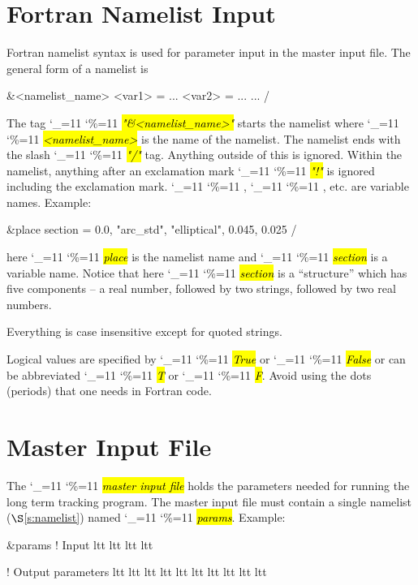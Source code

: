 \documentclass{hitec}
\newcommand\dottcmd[1]{\hl{\em#1}\endgroup}
\newcommand{\vn}{\begingroup\catcode`\_=11 \catcode`\%=11 \dottcmd}
\newcommand{\sref}[1]{$\S$\ref{#1}}
\newcommand{\Section}[1]{\section{#1}\vspace*{-1ex}}
\begin{document}
{{{{{{{{{{{{{{{{{{%
\Section{Fortran Namelist Input}
\label{s:namelist}

Fortran namelist syntax is used for parameter input in the master input file. The general form of a namelist is
\begin{code}
&<namelist_name>
  <var1> = ...
  <var2> = ...
  ...
/
\end{code}
The tag \vn{"\&<namelist_name>"} starts the namelist where
\vn{<namelist_name>} is the name of the namelist. The namelist ends
with the slash \vn{"/"} tag. Anything outside of this is
ignored. Within the namelist, anything after an exclamation mark
\vn{"!"} is ignored including the exclamation mark. \vn{<var1>},
\vn{<var2>}, etc. are variable names. Example:
\begin{code}
&place 
  section = 0.0, "arc_std", "elliptical", 0.045, 0.025 
/
\end{code}
here \vn{place} is the namelist name and \vn{section} is a
variable name.  Notice that here \vn{section} is a ``structure'' which
has five components -- a real number, followed by two strings,
followed by two real numbers.

Everything is case insensitive except for quoted strings.

Logical values are specified by \vn{True} or \vn{False} or can be
abbreviated \vn{T} or \vn{F}. Avoid using the dots (periods) that one
needs in Fortran code.

\newpage

\Section{Master Input File}
\label{s:input}

The \vn{master input file} holds the parameters needed for running the long term tracking
program. The master input file must contain a single namelist (\sref{s:namelist}) named \vn{params}.
Example:
\begin{code}
&params
  ! Input
  ltt%
  ltt%
  ltt%
  ltt%

  ! Output parameters
  ltt%
  ltt%
  ltt%
  ltt%
  ltt%
  ltt%
  ltt%
  ltt%
  ltt%
  ltt%


\end{code}}}}}}}}}}}}}}}}}}}
\end{document}
